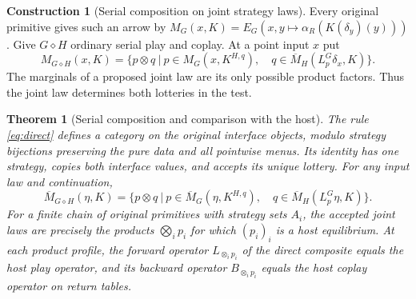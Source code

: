\documentclass[11pt,a4paper]{article}
\newtheorem{theorem}{Theorem}[section]
\theoremstyle{definition}
\newtheorem*{construction}{Construction}
\begin{document}
\begin{construction}[Serial composition on joint strategy laws]
    Every original primitive gives such an arrow by $M_G(x,K)=E_G(x,y\mapsto\alpha_R(K(\delta_y)(y)))$. Give $G\diamond H$ ordinary serial play and coplay. At a point input $x$ put
    \begin{equation}
        M_{G\diamond H}(x,K)=
        \bigl\{p\otimes q\ \big|\ p\in M_G(x,K^{H,q}),\quad
        q\in\overline M_H(L_p^G\delta_x,K)\bigr\}.
        \label{eq:direct}
    \end{equation}
    The marginals of a proposed joint law are its only possible product factors. Thus the joint law determines both lotteries in the test.
\end{construction}

\begin{theorem}[Serial composition and comparison with the host]\label{thm:direct}
    The rule \eqref{eq:direct} defines a category on the original interface objects, modulo strategy bijections preserving the pure data and all pointwise menus. Its identity has one strategy, copies both interface values, and accepts its unique lottery. For any input law and continuation,
    \begin{equation}
        \overline M_{G\diamond H}(\eta,K)=
        \bigl\{p\otimes q\ \big|\ p\in\overline M_G(\eta,K^{H,q}),\quad
        q\in\overline M_H(L_p^G\eta,K)\bigr\}.
        \label{eq:direct-mixed}
    \end{equation}
    For a finite chain of original primitives with strategy sets $A_i$, the accepted joint laws are precisely the products $\bigotimes_i p_i$ for which $(p_i)_i$ is a host equilibrium. At each product profile, the forward operator $L_{\otimes_i p_i}$ of the direct composite equals the host play operator, and its backward operator $B_{\otimes_i p_i}$ equals the host coplay operator on return tables.
\end{theorem}
\end{document}
